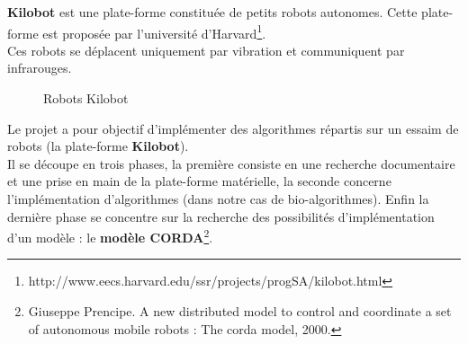 \documentclass[a4paper,8pt]{report}
\begin{document}
\textbf{Kilobot} est une plate-forme constitu\'ee de petits robots autonomes. Cette plate-forme est propos\'ee par l'universit\'e d'Harvard\footnote{http://www.eecs.harvard.edu/ssr/projects/progSA/kilobot.html}. \\
Ces robots se d\'eplacent uniquement par vibration et communiquent par infrarouges.\\

\begin{figure}[!h]
    \centering
    \caption{Robots Kilobot}
\end{figure}

\smallskip
Le projet a pour objectif d'impl\'ementer des algorithmes r\'epartis sur un essaim de robots (la plate-forme \textbf{Kilobot}).\\
Il se d\'ecoupe en trois phases, la premi\`ere consiste en une recherche documentaire et une prise en main de la plate-forme mat\'erielle, la seconde concerne l'impl\'ementation d'algorithmes (dans notre cas de bio-algorithmes). Enfin la derni\`ere phase se concentre sur la recherche des possibilit\'es d'impl\'ementation d'un mod\`ele : le \textbf{mod\`ele CORDA}\footnote{Giuseppe Prencipe. A new distributed model to control and coordinate a set of autonomous mobile robots : The corda model, 2000.}.\\

\end{document}
